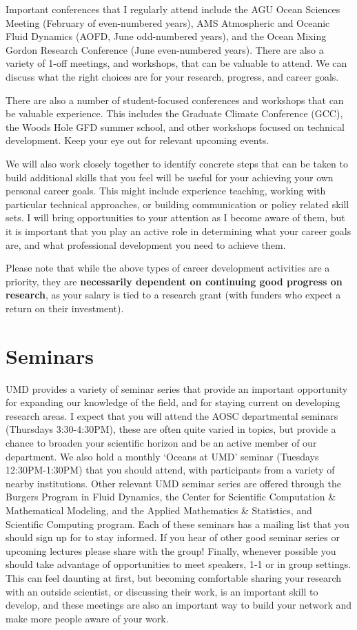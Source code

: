 \documentclass{classassignments}
\begin{document}
Important conferences that I regularly attend include the AGU Ocean Sciences Meeting (February of even-numbered years), AMS Atmospheric and Oceanic Fluid Dynamics (AOFD, June odd-numbered years), and the Ocean Mixing Gordon Research Conference (June even-numbered years). There are also a variety of 1-off meetings, and workshops, that can be valuable to attend. We can discuss what the right choices are for your research, progress, and career goals.\medskip

There are also a number of student-focused conferences and workshops that can be valuable experience. This includes the Graduate Climate Conference (GCC), the Woods Hole GFD summer school, and other workshops focused on technical development. Keep your eye out for relevant upcoming events. \medskip

We will also work closely together to identify concrete steps that can be taken to build additional skills that you feel will be useful for your achieving your own personal career goals. This might include experience teaching, working with particular technical approaches, or building communication or policy related skill sets. I will bring opportunities to your attention as I become aware of them, but it is important that you play an active role in determining what your career goals are, and what professional development you need to achieve them.  \medskip

 Please note that while the above types of career development activities are a priority, they are \textbf{necessarily dependent on continuing good progress on research}, as your salary is tied to a research grant (with funders who expect a return on their investment). \medskip

\section{Seminars}
UMD provides a variety of seminar series that provide an important opportunity for expanding our knowledge of the field, and for staying current on developing research areas. I expect that you will attend the AOSC departmental seminars (Thursdays 3:30-4:30PM), these are often quite varied in topics, but provide a chance to broaden your scientific horizon and be an active member of our department. We also hold a monthly `Oceans at UMD' seminar (Tuesdays 12:30PM-1:30PM) that you should attend, with participants from a variety of nearby institutions. Other relevant UMD seminar series are offered through the Burgers Program in Fluid Dynamics, the Center for Scientific Computation \& Mathematical Modeling, and the Applied Mathematics \& Statistics, and Scientific Computing program. Each of these seminars has a mailing list that you should sign up for to stay informed. If you hear of other good seminar series or upcoming lectures please share with the group! Finally, whenever possible you should take advantage of opportunities to meet speakers, 1-1 or in group settings. This can feel daunting at first, but becoming comfortable sharing your research with an outside scientist, or discussing their work, is an important skill to develop, and these meetings are also an important way to build your network and make more people aware of your work.
\end{document}
